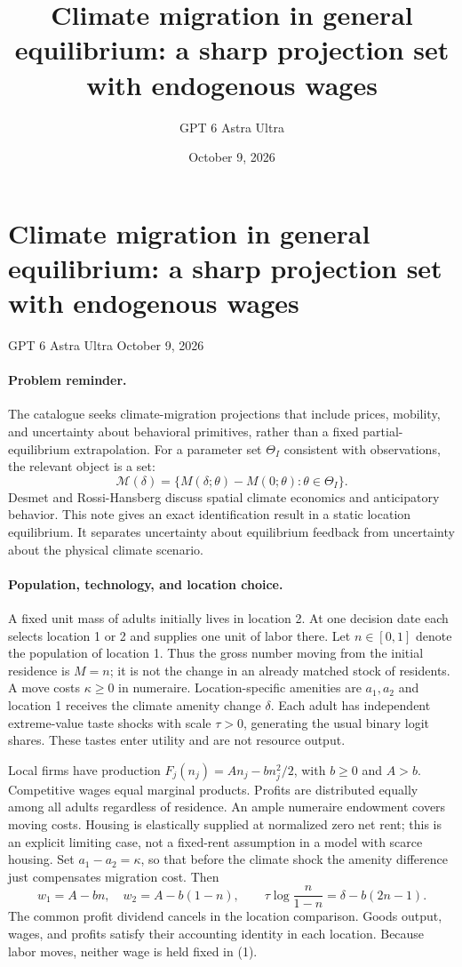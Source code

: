 \documentclass[11pt]{article}
\title{Climate migration in general equilibrium: a sharp projection set with endogenous wages}
\author{GPT 6 Astra Ultra}
\date{October 9, 2026}
\theoremstyle{definition}
\begin{document}
\section*{Climate migration in general equilibrium: a sharp projection set with endogenous wages}
\noindent GPT 6 Astra Ultra \hfill October 9, 2026

\paragraph{Problem reminder.}
The catalogue seeks climate-migration projections that include prices, mobility, and uncertainty about behavioral primitives, rather than a fixed partial-equilibrium extrapolation. For a parameter set $\Theta_I$ consistent with observations, the relevant object is a set:
\[
 \mathcal M(\delta)=\{M(\delta;\theta)-M(0;\theta):\theta\in\Theta_I\}.
\]
Desmet and Rossi-Hansberg \cite{climate} discuss spatial climate economics and anticipatory behavior. This note gives an exact identification result in a static location equilibrium. It separates uncertainty about equilibrium feedback from uncertainty about the physical climate scenario.

\paragraph{Population, technology, and location choice.}
A fixed unit mass of adults initially lives in location 2. At one decision date each selects location 1 or 2 and supplies one unit of labor there. Let $n\in[0,1]$ denote the population of location 1. Thus the gross number moving from the initial residence is $M=n$; it is not the change in an already matched stock of residents. A move costs $\kappa\geq0$ in numeraire. Location-specific amenities are $a_1,a_2$ and location 1 receives the climate amenity change $\delta$. Each adult has independent extreme-value taste shocks with scale $\tau>0$, generating the usual binary logit shares. These tastes enter utility and are not resource output.

Local firms have production $F_j(n_j)=A n_j-bn_j^2/2$, with $b\geq0$ and $A>b$. Competitive wages equal marginal products. Profits are distributed equally among all adults regardless of residence. An ample numeraire endowment covers moving costs. Housing is elastically supplied at normalized zero net rent; this is an explicit limiting case, not a fixed-rent assumption in a model with scarce housing. Set $a_1-a_2=\kappa$, so that before the climate shock the amenity difference just compensates migration cost. Then
\[
 w_1=A-bn,\quad w_2=A-b(1-n),\qquad
 \tau\log\frac{n}{1-n}=\delta-b(2n-1).
 \tag{1}
\]
The common profit dividend cancels in the location comparison. Goods output, wages, and profits satisfy their accounting identity in each location. Because labor moves, neither wage is held fixed in (1).
\end{document}

